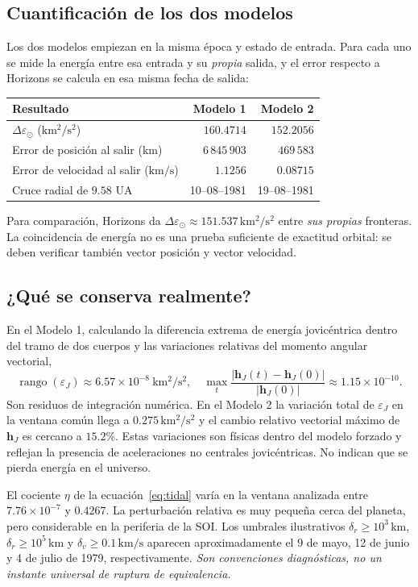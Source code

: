 \documentclass[11pt,a4paper]{article}
\newcommand{\vect}[1]{\bm{#1}}
\begin{document}
\subsection{Cuantificación de los dos modelos}
Los dos modelos empiezan en la misma época y estado de entrada. Para cada uno se mide la energía entre esa entrada y su \emph{propia} salida, y el error respecto a Horizons se calcula en esa misma fecha de salida:
\begin{center}\begin{tabular}{lrr}\toprule
Resultado & Modelo 1 & Modelo 2\\\midrule
$\Delta\varepsilon_\odot$ ($\mathrm{km^2/s^2}$) & $160.4714$ & $152.2056$\\
Error de posición al salir (km) & $6\,845\,903$ & $469\,583$\\
Error de velocidad al salir ($\mathrm{km/s}$) & $1.1256$ & $0.08715$\\
Cruce radial de $9.58$ UA & 10--08--1981 & 19--08--1981\\\bottomrule\end{tabular}\end{center}
Para comparación, Horizons da $\Delta\varepsilon_\odot\approx151.537\,\mathrm{km^2/s^2}$ entre \emph{sus propias} fronteras. La coincidencia de energía no es una prueba suficiente de exactitud orbital: se deben verificar también vector posición y vector velocidad.

\subsection{¿Qué se conserva realmente?}
En el Modelo 1, calculando la diferencia extrema de energía jovicéntrica dentro del tramo de dos cuerpos y las variaciones relativas del momento angular vectorial,
\begin{equation}
\operatorname{rango}(\varepsilon_J)\approx6.57\times10^{-8}\ \mathrm{km^2/s^2},
\quad \max_t\frac{|\vect h_J(t)-\vect h_J(0)|}{|\vect h_J(0)|}
\approx1.15\times10^{-10}.
\end{equation}
Son residuos de integración numérica. En el Modelo 2 la variación total de $\varepsilon_J$ en la ventana común llega a $0.275\,\mathrm{km^2/s^2}$ y el cambio relativo vectorial máximo de $\vect h_J$ es cercano a $15.2\%$. Estas variaciones son físicas dentro del modelo forzado y reflejan la presencia de aceleraciones no centrales jovicéntricas. No indican que se pierda energía en el universo.

El cociente $\eta$ de la ecuación~\eqref{eq:tidal} varía en la ventana analizada entre $7.76\times10^{-7}$ y $0.4267$. La perturbación relativa es muy pequeña cerca del planeta, pero considerable en la periferia de la SOI. Los umbrales ilustrativos $\delta_r\geq10^3\,\mathrm{km}$, $\delta_r\geq10^5\,\mathrm{km}$ y $\delta_v\geq0.1\,\mathrm{km/s}$ aparecen aproximadamente el 9 de mayo, 12 de junio y 4 de julio de 1979, respectivamente. \emph{Son convenciones diagnósticas, no un instante universal de ruptura de equivalencia.}
\end{document}
